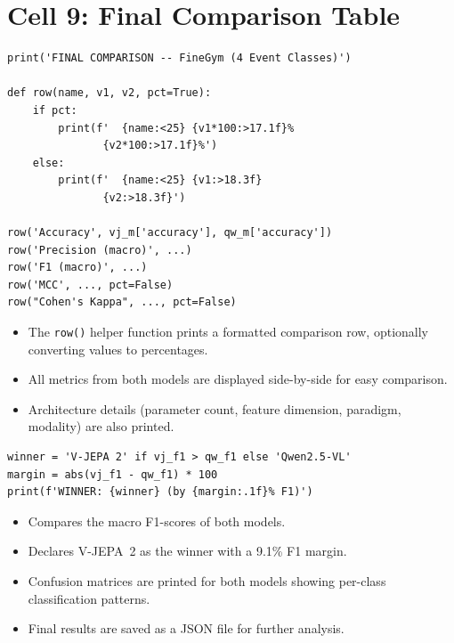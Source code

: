 \section{Cell 9: Final Comparison Table}

\begin{lstlisting}
print('FINAL COMPARISON -- FineGym (4 Event Classes)')

def row(name, v1, v2, pct=True):
    if pct:
        print(f'  {name:<25} {v1*100:>17.1f}%
               {v2*100:>17.1f}%')
    else:
        print(f'  {name:<25} {v1:>18.3f}
               {v2:>18.3f}')

row('Accuracy', vj_m['accuracy'], qw_m['accuracy'])
row('Precision (macro)', ...)
row('F1 (macro)', ...)
row('MCC', ..., pct=False)
row("Cohen's Kappa", ..., pct=False)
\end{lstlisting}

\begin{explanation}
\begin{itemize}[nosep]
  \item The \texttt{row()} helper function prints a formatted comparison row, optionally converting values to percentages.
  \item All metrics from both models are displayed side-by-side for easy comparison.
  \item Architecture details (parameter count, feature dimension, paradigm, modality) are also printed.
\end{itemize}
\end{explanation}

\begin{lstlisting}
winner = 'V-JEPA 2' if vj_f1 > qw_f1 else 'Qwen2.5-VL'
margin = abs(vj_f1 - qw_f1) * 100
print(f'WINNER: {winner} (by {margin:.1f}% F1)')
\end{lstlisting}

\begin{explanation}
\begin{itemize}[nosep]
  \item Compares the macro F1-scores of both models.
  \item Declares V-JEPA~2 as the winner with a 9.1\% F1 margin.
  \item Confusion matrices are printed for both models showing per-class classification patterns.
  \item Final results are saved as a JSON file for further analysis.
\end{itemize}
\end{explanation}

